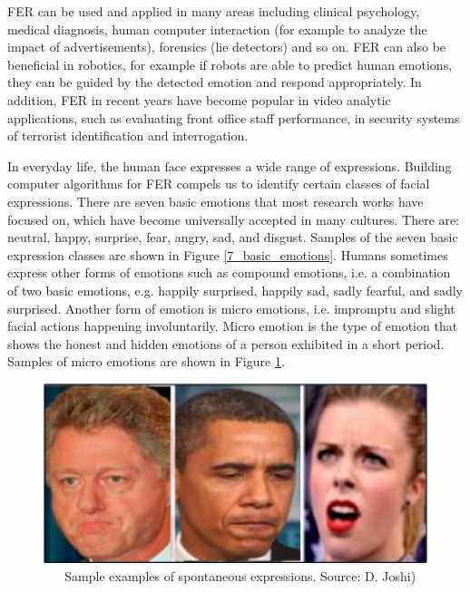 \documentclass[master]{thesis-uestc}
\begin{document}
FER can be used and applied in many areas including clinical psychology, medical diagnosis, human computer interaction (for example to analyze the impact of advertisements), forensics (lie detectors) and so on\cite{Ivanovsky-2017, sang-2017}. FER can also be beneficial in robotics, for example if robots are able to predict human emotions, they can be guided by the detected emotion and respond appropriately. In addition, FER in recent years have become popular in video analytic applications, such as evaluating front office staff performance, in security systems of terrorist identification and interrogation\cite{sang-2017}.

In everyday life, the human face expresses a wide range of expressions. Building computer algorithms for FER compels us to identify certain classes of facial expressions. There are seven basic emotions that most research works have focused on, which have become universally accepted in many cultures. There are: neutral, happy, surprise, fear, angry, sad, and disgust\cite{Yu:2013:LRF:2459511.2459661}. Samples of the seven basic expression classes are shown in Figure \ref{7_basic_emotions}. Humans sometimes express other forms of emotions such as compound emotions, i.e. a combination of two basic emotions, e.g. happily surprised, happily sad, sadly fearful, and sadly surprised. Another form of emotion is micro emotions, i.e. impromptu and slight facial actions happening involuntarily. Micro emotion is the type of emotion that shows the honest and hidden emotions of a person exhibited in a short period\cite{josh2018}. Samples of micro emotions are shown in Figure \ref{micro_emotions}.

\begin{figure}[ht]
\includegraphics[width=5in]{pic/micro_expressions.png}
\caption{\,\,\,\,\,\,\,\,\,\,Sample examples of spontaneous expressions. Source: D. Joshi\cite{josh2018})}
\label{micro_emotions}
\end{figure}
\end{document}
